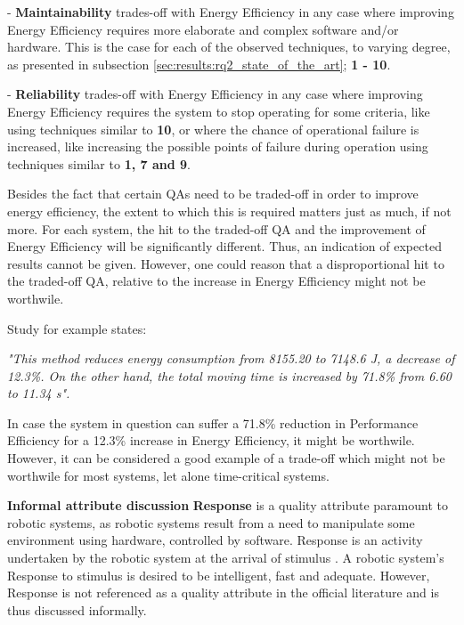 - \textbf{Maintainability} trades-off with Energy Efficiency in any case where improving Energy Efficiency requires more elaborate and complex software and/or hardware. 
This is the case for each of the observed techniques, to varying degree, as presented in subsection \ref{sec:results:rq2_state_of_the_art}; \textbf{1 - 10}.

\vspace{1mm}

- \textbf{Reliability} trades-off with Energy Efficiency in any case where improving Energy Efficiency requires the system to 
stop operating for some criteria, like using techniques similar to \textbf{10}, or where the chance of operational failure is increased, 
like increasing the possible points of failure during operation using techniques similar to \textbf{1, 7 and 9}. 

Besides the fact that certain QAs need to be traded-off in order to improve energy efficiency, the extent to which this is required 
matters just as much, if not more.
For each system, the hit to the traded-off QA and the improvement of Energy Efficiency will be significantly different.
Thus, an indication of expected results cannot be given.
However, one could reason that a disproportional hit to the traded-off QA, relative to the increase in Energy Efficiency might not be worthwile.

Study \cite{kaitwanidvilai2020industrial_robot_cycle_time} for example states: 

\noindent\textit{"This method reduces energy consumption from 8155.20 to 7148.6 J, 
a decrease of 12.3\%. On the other hand, the total moving time is increased by 71.8\% from 6.60 to 11.34 s".}

In case the system in question can suffer a 71.8\% reduction in Performance Efficiency for a 12.3\% increase in Energy Efficiency, it might be worthwile.
However, it can be considered a good example of a trade-off which might not be worthwile for most systems, let alone time-critical systems.

\vspace{1mm}

\noindent \textbf{Informal attribute discussion}
\newline
\textbf{Response} is a quality attribute paramount to robotic systems, 
as robotic systems result from a need to manipulate some environment using hardware, controlled by software.
Response is an activity undertaken by the robotic system at the arrival of stimulus \cite{shakhimardanov2007robotic_response}.
A robotic system's Response to stimulus is desired to be intelligent, fast and adequate.
However, Response is not referenced as a quality attribute in the official literature and is thus discussed informally.

